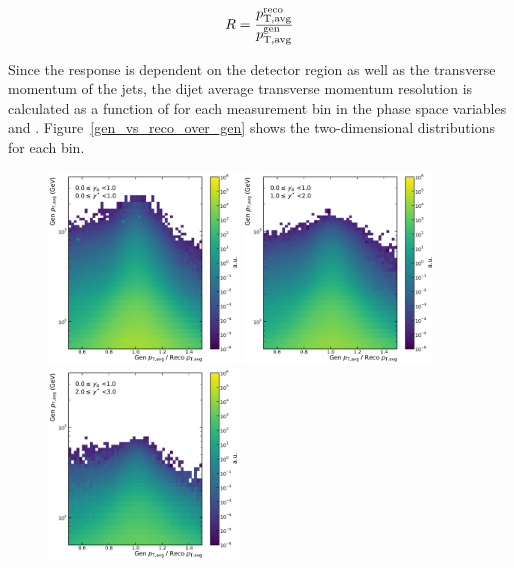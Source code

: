 \begin{equation}
    R = \frac{p_{\mathrm{T,avg}}^{\text{reco}}}{p_{\mathrm{T,avg}}^{\text{gen}}}
\end{equation}

Since the response is dependent on the detector region as well as the transverse
momentum of the jets, the dijet average transverse momentum resolution is
calculated as a function of \ptavggen for each measurement bin in the phase
space variables \ystar and \yboost. Figure~\ref{gen_vs_reco_over_gen} shows the
two-dimensional distributions for each bin.

\begin{figure}[htbp]
    \centering
    \includegraphics[width=0.45\textwidth]{figures/measurement/gen_vs_reco_vs_gen_ptavg_yb0ys0.pdf}\hfill
    \includegraphics[width=0.45\textwidth]{figures/measurement/gen_vs_reco_vs_gen_ptavg_yb0ys1.pdf}
    \includegraphics[width=0.45\textwidth]{figures/measurement/gen_vs_reco_vs_gen_ptavg_yb0ys2.pdf}\hfill

\end{figure}
